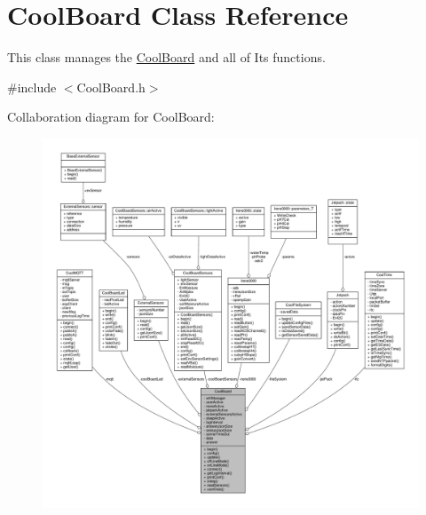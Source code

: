 \hypertarget{classCoolBoard}{}\section{Cool\+Board Class Reference}
\label{classCoolBoard}


This class manages the \hyperlink{classCoolBoard}{Cool\+Board} and all of Its functions.  




{\ttfamily \#include $<$Cool\+Board.\+h$>$}



Collaboration diagram for Cool\+Board\+:
\nopagebreak
\begin{figure}[H]
\begin{center}
\leavevmode
\includegraphics[width=350pt]{classCoolBoard__coll__graph}
\end{center}
\end{figure}
